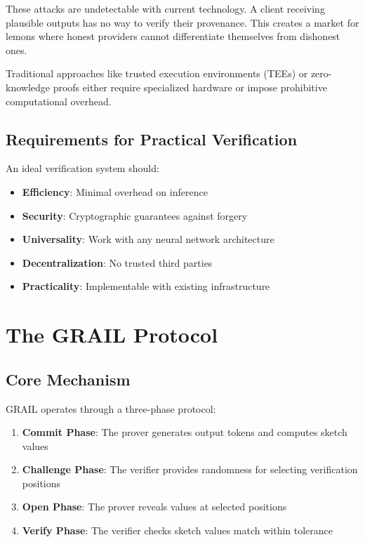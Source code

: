 \documentclass[11pt,a4paper]{article}
\begin{document}
These attacks are undetectable with current technology. A client receiving plausible outputs has no way to verify their provenance. This creates a market for lemons where honest providers cannot differentiate themselves from dishonest ones.

Traditional approaches like trusted execution environments (TEEs) or zero-knowledge proofs either require specialized hardware or impose prohibitive computational overhead.

\subsection{Requirements for Practical Verification}

An ideal verification system should:
\begin{itemize}
    \item \textbf{Efficiency}: Minimal overhead on inference
    \item \textbf{Security}: Cryptographic guarantees against forgery
    \item \textbf{Universality}: Work with any neural network architecture
    \item \textbf{Decentralization}: No trusted third parties
    \item \textbf{Practicality}: Implementable with existing infrastructure
\end{itemize}

\section{The GRAIL Protocol}

\subsection{Core Mechanism}

GRAIL operates through a three-phase protocol:

\begin{enumerate}
    \item \textbf{Commit Phase}: The prover generates output tokens and computes sketch values
    \item \textbf{Challenge Phase}: The verifier provides randomness for selecting verification positions  
    \item \textbf{Open Phase}: The prover reveals values at selected positions
    \item \textbf{Verify Phase}: The verifier checks sketch values match within tolerance
\end{enumerate}
\end{document}
